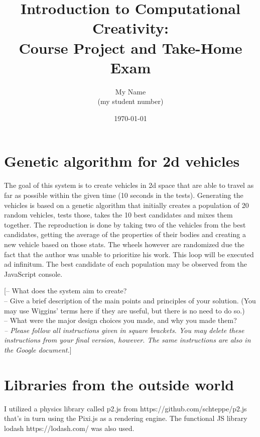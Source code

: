 \documentclass[english]{tktltiki}
\begin{document}
\singlespacing

\title{Introduction to Computational Creativity: \\
Course Project and Take-Home Exam}

\author{My Name \\
(my student number)}

\date{\today}

\maketitle


\section{Genetic algorithm for 2d vehicles}
The goal of this system is to create vehicles in 2d space that are able to travel as far as possible within the given time (10 seconds in the tests).
Generating the vehicles is based on a genetic algorithm that initially creates a population of 20 random vehicles, tests those, takes the 10 best candidates and mixes them together.
The reproduction is done by taking two of the vehicles from the best candidates, getting the average of the properties of their bodies and creating a new vehicle based on those stats.
The wheels however are randomized due the fact that the author was unable to prioritize his work. This loop will be executed ad infinitum. The best candidate of each population may be observed from the
JavaScript console.

[-- What does the system aim to create?\\
-- Give a brief description of the main points and principles of your solution. (You may use Wiggins' terms here if they are useful, but there is no need to do so.)\\
-- What were the major design choices you made, and why you made them?\\
\emph{-- Please follow all instructions given in square brackets. You may delete these instructions from your final version, however. The same instructions are also in the Google document.}]



\pagebreak
\section{Libraries from the outside world}
I utilized a physics library called p2.js from https://github.com/schteppe/p2.js that's in turn using the Pixi.js as a rendering engine. The functional JS library lodash https://lodash.com/ was also used.
\end{document}
